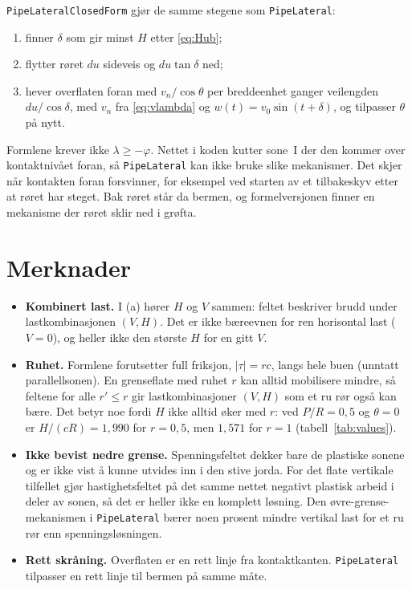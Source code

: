 \documentclass[11pt,a4paper]{article}
\begin{document}
\texttt{PipeLateralClosedForm} gjør de samme stegene som
\texttt{PipeLateral}:
\begin{enumerate}
  \item finner $\delta$ som gir minst $H$ etter \eqref{eq:Hub};
  \item flytter røret $du$ sideveis og $du\tan\delta$ ned;
  \item hever overflaten foran med $v_n/\cos\theta$ per breddeenhet ganger
        veilengden $du/\cos\delta$, med $v_n$ fra \eqref{eq:vlambda} og
        $w(t) = v_0\sin(t + \delta)$, og tilpasser $\theta$ på nytt.
\end{enumerate}
Formlene krever ikke $\lambda \ge -\varphi$.  Nettet i koden kutter sone~I der
den kommer over kontaktnivået foran, så \texttt{PipeLateral} kan ikke bruke
slike mekanismer.  Det skjer når kontakten foran forsvinner, for eksempel ved
starten av et tilbakeskyv etter at røret har steget.  Bak røret står da
bermen, og formelversjonen finner en mekanisme der røret sklir ned i
grøfta.

\section{Merknader}

\begin{itemize}
  \item \textbf{Kombinert last.}  I (a) hører $H$ og $V$ sammen: feltet
        beskriver brudd under lastkombinasjonen $(V, H)$.  Det er ikke
        bæreevnen for ren horisontal last ($V = 0$), og heller ikke den
        største $H$ for en gitt $V$.
  \item \textbf{Ruhet.}  Formlene forutsetter full friksjon, $|\tau| = rc$,
        langs hele buen (unntatt parallellsonen).  En grenseflate med ruhet
        $r$ kan alltid mobilisere mindre, så feltene for alle $r' \le r$ gir
        lastkombinasjoner $(V, H)$ som et ru rør også kan bære.  Det betyr
        noe fordi $H$ ikke alltid øker med $r$: ved $P/R = 0{,}5$ og
        $\theta = 0$ er $H/(cR) = 1{,}990$ for $r = 0{,}5$, men $1{,}571$ for
        $r = 1$ (tabell~\ref{tab:values}).
  \item \textbf{Ikke bevist nedre grense.}  Spenningsfeltet dekker bare de
        plastiske sonene og er ikke vist å kunne utvides inn i den stive
        jorda.  For det flate vertikale tilfellet gjør hastighetsfeltet på
        det samme nettet negativt plastisk arbeid i deler av sonen, så det
        er heller ikke en komplett løsning.  Den øvre-grense-mekanismen i
        \texttt{PipeLateral} bærer noen prosent mindre vertikal last for et
        ru rør enn spenningsløsningen.
  \item \textbf{Rett skråning.}  Overflaten er en rett linje fra
        kontaktkanten.  \texttt{PipeLateral} tilpasser en rett linje til
        bermen på samme måte.
\end{itemize}
\end{document}
